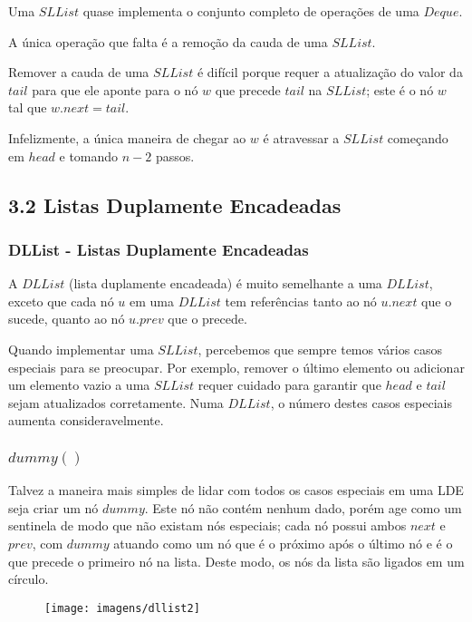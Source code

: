 \documentclass{beamer}
\begin{document}
\begin{frame}
Uma $SLList$ quase implementa o conjunto completo de operações de uma $Deque$.

A única operação que falta é a remoção da cauda de uma $SLList$.

Remover a cauda de uma $SLList$ é difícil porque requer a atualização do valor da $tail$ para que ele aponte para o nó $w$ que precede $tail$ na $ SLList $; este é o nó $w$ tal que $w.next=tail$. 

Infelizmente, a única maneira de chegar ao $w$ é atravessar a $SLList$ começando em $head$ e tomando $n-2$ passos.
\end{frame}

\subsection{3.2 Listas Duplamente Encadeadas}
\begin{frame}
\frametitle{DLList - Listas Duplamente Encadeadas}
A $DLList$ (lista duplamente encadeada) é muito semelhante a uma $DLList$, exceto que cada nó $u$ em uma $DLList$ tem referências tanto ao nó $u.next$ que o sucede, quanto ao nó $u.prev$ que o precede.

Quando implementar uma $SLList$, percebemos que sempre temos vários casos especiais para se preocupar. Por exemplo, remover o último elemento ou adicionar um elemento vazio a uma $SLList$ requer cuidado para garantir que $head$ e $tail$ sejam atualizados corretamente. Numa $DLList$, o número destes casos especiais aumenta consideravelmente.
\end{frame}

\begin{frame}
\frametitle{$dummy()$}
Talvez a maneira mais simples de lidar com todos os casos especiais em uma LDE seja criar um nó $ \ensuremath{\ensuremath{\mathit{dummy}}}$. Este nó não contém nenhum dado, porém age como um sentinela de modo que não existam nós especiais; cada nó possui ambos $ \ensuremath{\ensuremath{\mathit{next}}}$ e $ \ensuremath{\ensuremath{\mathit{prev}}}$, com $ \ensuremath{\ensuremath{\mathit{dummy}}}$ atuando como um nó que é o próximo após o último nó e é o que precede o primeiro nó na lista. Deste modo, os nós da lista são ligados em um círculo. 

\begin{figure}
  \begin{center}
    \texttt{[image: imagens/dllist2]}
  \end{center}
\end{figure}
\end{frame}
\end{document}
